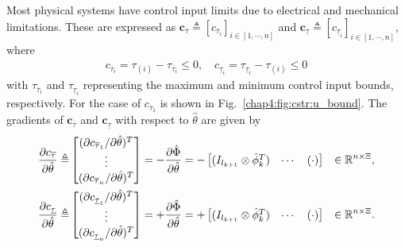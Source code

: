 Most physical systems have control input limits due to electrical and mechanical limitations. 
These are expressed as $\mathbf{c}_{\overline \tau}\triangleq [c_{\overline \tau_i}]_{i\in[1,\cdots,n]}$ and $\mathbf{c}_{\underline\tau}\triangleq [c_{\underline\tau_i}]_{i\in[1,\cdots,n]}$, where
\begin{equation}
    \begin{aligned}
        c_{\overline \tau_i}=\tau_{(i)} - {\tau_{\overline \tau_i}} \le 0
        ,\quad
        c_{\underline\tau_i}={\tau_{\underline\tau_i}}-\tau_{(i)} \le 0
    \end{aligned}
    \label{chap4:eq:cstr:input_bound}
\end{equation}
with $\tau_{\overline \tau_i}$ and $\tau_{\underline\tau_i}$ representing the maximum and minimum control input bounds, respectively.
For the case of $c_{\overline \tau_1 }$ is shown in Fig.~\ref{chap4:fig:cstr:u_bound}.
The gradients of $\mathbf{c}_{\overline \tau}$ and $\mathbf{c}_{\underline\tau}$ with respect to $\hat\theta$ are given by
\begin{equation}
    \begin{aligned}
        {\partial \mathbf \mathbf c_{\overline \tau} \over \partial \hat\theta}
        \triangleq
        & 
        \begin{bmatrix}
            (\partial c_{\overline \tau_1}/\partial \hat\theta)^T \\
            \vdots \\
            (\partial c_{\overline \tau_n}/\partial \hat\theta)^T
        \end{bmatrix}
         = -{\partial \hat\Phi\over\partial\hat\theta}
        =
        -\begin{bmatrix}
            (I_{l_{k+1}}\otimes \hat\phi_{k}^T)&
            \cdots &
            (
            \cdot
            )
        \end{bmatrix} 
        &
        \in
        \mathbb{R}^{n\times \Xi}
        , 
        \\
        {\partial \mathbf \mathbf c_{\underline\tau} \over \partial \hat\theta}         
        \triangleq
        & 
        \begin{bmatrix}
            (\partial c_{\underline\tau_1}/\partial \hat\theta)^T \\
            \vdots \\
            (\partial c_{\underline\tau_n}/\partial \hat\theta)^T
        \end{bmatrix}
        = +{\partial \hat\Phi\over\partial\hat\theta}
        =
        +\begin{bmatrix}
            (I_{l_{k+1}}\otimes \hat\phi_{k}^T)&
            \cdots &
            (
            \cdot
            )
        \end{bmatrix} 
        &
        \in
        \mathbb{R}^{n\times \Xi}
        .
    \end{aligned}
    \label{chap4:eq:cstr:input_bound_grad}
\end{equation}

